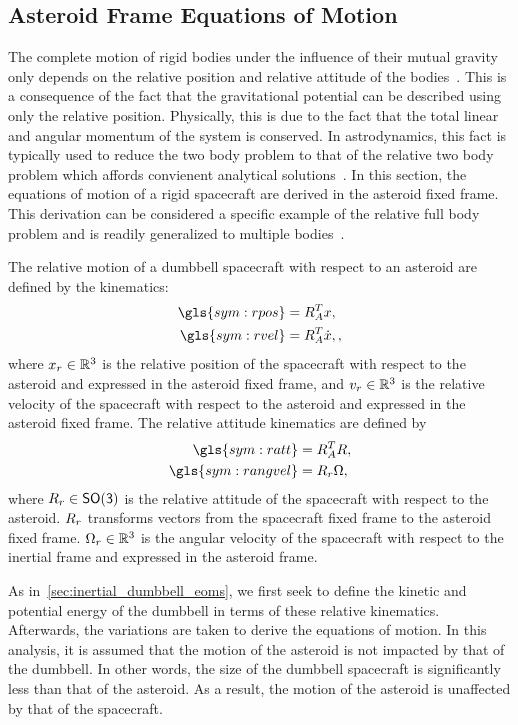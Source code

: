 \subsection{Asteroid Frame Equations of Motion}\label{sec:asteroid_dumbbell_eoms}
The complete motion of rigid bodies under the influence of their mutual gravity only depends on the relative position and relative attitude of the bodies~\cite{lee2007a}.
This is a consequence of the fact that the gravitational potential can be described using only the relative position.
Physically, this is due to the fact that the total linear and angular momentum of the system is conserved.
In astrodynamics, this fact is typically used to reduce the two body problem to that of the relative two body problem which affords convienent analytical solutions~\cite{vallado2007,bate1971}.
In this section, the equations of motion of a rigid spacecraft are derived in the asteroid fixed frame.
This derivation can be considered a specific example of the relative full body problem and is readily generalized to multiple bodies~\cite{lee2007a}.

The relative motion of a dumbbell spacecraft with respect to an asteroid are defined by the kinematics:
\begin{align}
    \gls{sym:rpos} &= R_A^T \vc{x}, \label{eq:relative_position} \\
    \gls{sym:rvel} &= R_A^T \dot{\vc{x}}, \label{eq:relative_velocity},
\end{align}
where \( x_r \in \mathbb{R}^3 \) is the relative position of the spacecraft with respect to the asteroid and expressed in the asteroid fixed frame, and \( v_r \in \mathbb{R}^3 \) is the relative velocity of the spacecraft with respect to the asteroid and expressed in the asteroid fixed frame.
The relative attitude kinematics are defined by
\begin{align}
    \gls{sym:ratt} &= R_A^T R, \label{eq:relative_attitude} \\
    \gls{sym:rangvel} &= \ratt  \vc{\Omega}, \label{eq:relative_angular_velocity}
\end{align}
where \( R_r \in \mathsf{SO(3)} \) is the relative attitude of the spacecraft with respect to the asteroid.
\( R_r \) transforms vectors from the spacecraft fixed frame to the asteroid fixed frame.
\( \Omega_r \in \mathbb{R}^3 \) is the angular velocity of the spacecraft with respect to the inertial frame and expressed in the asteroid frame.

As in~\cref{sec:inertial_dumbbell_eoms}, we first seek to define the kinetic and potential energy of the dumbbell in terms of these relative kinematics. 
Afterwards, the variations are taken to derive the equations of motion.
In this analysis, it is assumed that the motion of the asteroid is not impacted by that of the dumbbell.
In other words, the size of the dumbbell spacecraft is significantly less than that of the asteroid. 
As a result, the motion of the asteroid is unaffected by that of the spacecraft.

